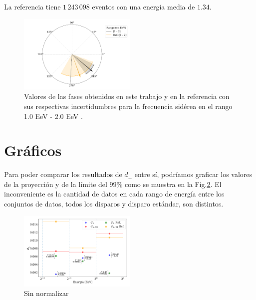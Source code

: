     La referencia tiene $1\,243\,098$ eventos con una energía media de $1.34$.

   
    \begin{figure}[H]
        \begin{small}
            \begin{center}
                \includegraphics[width=0.5\textwidth]{phase_tercer_bin.pdf}
            \end{center}
        \caption{Valores de las fases obtenidos en este trabajo y en la referencia con sus respectivas incertidumbres para la frecuencia sidérea en el  rango 1.0 EeV - 2.0 EeV .}
        \label{fig:tercer}
        \end{small}
    \end{figure}


    \section*{Gráficos}

    Para poder comparar los resultados de $d_\perp$ entre sí, podríamos graficar los valores de la proyección y de la límite del $99\%$ como se muestra en la Fig.\ref{fig:no_normalizado}. El inconveniente es la cantidad de datos en cada rango de energía entre los conjuntos de datos, todos los disparos y disparo estándar, son distintos.

    \begin{figure}[H]
        \begin{small}
            \begin{center}
                \includegraphics[width=0.5\textwidth]{d_perp_no_normalizado_v2.pdf}
            \end{center}
            \caption{Sin normalizar}
            \label{fig:no_normalizado}
        \end{small}
    \end{figure}
    
